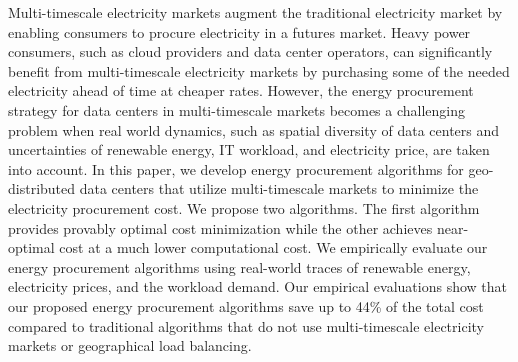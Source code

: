 Multi-timescale electricity markets augment the traditional electricity market by enabling consumers to procure electricity in a futures market. Heavy power consumers, such as cloud providers and data center operators, can significantly benefit from multi-timescale electricity markets by purchasing some of the needed electricity ahead of time at cheaper rates. However, the energy procurement strategy for data centers in multi-timescale markets becomes a challenging problem when real world dynamics, such as spatial diversity of data centers and uncertainties of renewable energy, IT workload, and electricity price, are taken into account. In this paper, we develop energy procurement algorithms for geo-distributed data centers that utilize multi-timescale markets to minimize the electricity procurement cost. We propose two algorithms. The first algorithm provides provably optimal cost minimization while the other achieves near-optimal cost at a much lower computational cost. We empirically evaluate our energy procurement algorithms using real-world traces of renewable energy, electricity prices, and the workload demand. Our empirical evaluations show that our proposed energy procurement algorithms save up to 44\% of the total cost compared to traditional algorithms that do not use multi-timescale electricity markets or geographical load balancing.